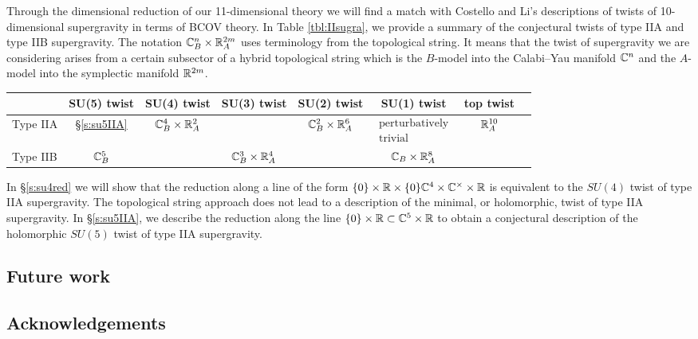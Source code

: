 Through the dimensional reduction of our 11-dimensional theory we will find a match with Costello and Li's descriptions of twists of 10-dimensional supergravity in terms of BCOV theory.
In Table \ref{tbl:IIsugra}, we provide a summary of the conjectural twists of type IIA and type IIB supergravity. 
The notation $\mathbb C^n_B \times \mathbb R^{2m}_A$ uses terminology from the topological string. 
It means that the twist of supergravity we are considering arises from a certain subsector of a hybrid topological string which is the $B$-model into the Calabi--Yau manifold $\mathbb C^n$ and the $A$-model into the symplectic manifold $\mathbb R^{2m}$. 

\begin{table}[]
\begin{tabular}{c|c|c|c|c|c|c|c|}
\cline{2-7}
& SU(5) twist & SU(4) twist & SU(3) twist & SU(2) twist & SU(1) twist & top twist  \\ \hline
\multicolumn{1}{|l|}{Type IIA} & \S \ref{s:su5IIA} & $\mathbb C^4_B \times \mathbb R^2_A$ & & $\mathbb C^2_B \times \mathbb R^6_A$ & $\begin{matrix} \text{perturbatively} \\ \text{trivial} \end{matrix}$ & $\mathbb R^{10}_A$  \\ \hline
\multicolumn{1}{|l|}{Type IIB} & $\mathbb C^5_B$ & & $\mathbb C^3_B \times \mathbb R^4_A$ & & $\mathbb C_B \times \mathbb R^8_A$ & \\ \hline
\end{tabular}
\end{table}

In \S \ref{s:su4red} we will show that the reduction along a line of the form $\{0\} \times \mathbb R \times \{0\} \mathbb C^4 \times \mathbb C^\times \times \mathbb R$ is equivalent to the $SU(4)$ twist of type IIA supergravity. 
The topological string approach does not lead to a description of the minimal, or holomorphic, twist of type IIA supergravity. 
In \S \ref{s:su5IIA}, we describe the reduction along the line $\{0\} \times \mathbb R \subset \mathbb C^5 \times \mathbb R$ to obtain a conjectural description of the holomorphic $SU(5)$ twist of type IIA supergravity. 


\subsection*{Future work} 

\subsection*{Acknowledgements}


%
